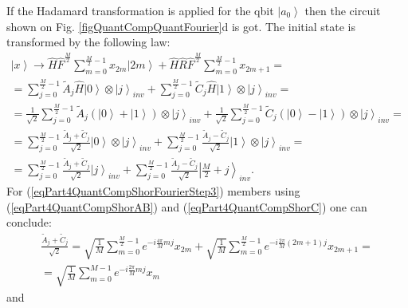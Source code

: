 \documentclass{llncs}
\begin{document}
If the Hadamard transformation is applied for the qbit 
$\left|a_0\right>$ then the circuit shown on 
Fig. \ref{figQuantCompQuantFourier}d is got. 
The initial state is transformed by the following law:
\begin{eqnarray}
\left|x\right> \rightarrow
\hat{H}\hat{F}^{\frac{M}{2}} \sum_{m = 0}^{\frac{M}{2} - 1}x_{2m} \left|2m\right> +
\hat{H}\hat{R}\hat{F}^{\frac{M}{2}}\sum_{m = 0}^{\frac{M}{2} - 1} x_{2m + 1} =
\nonumber \\
=
\sum_{j = 0}^{\frac{M}{2} - 1}
\tilde{A}_{j}
\hat{H}\left|0\right> \otimes \left|j\right>_{inv}
+
\sum_{j = 0}^{\frac{M}{2} - 1} 
\tilde{C}_{j}
\hat{H}\left|1\right> \otimes \left|j\right>_{inv} 
=
\nonumber \\
= 
\frac{1}{\sqrt{2}}\sum_{j = 0}^{\frac{M}{2} - 1}
\tilde{A}_{j} 
\left(\left|0\right> + \left|1\right> \right) \otimes  
\left|j\right>_{inv}
+
\frac{1}{\sqrt{2}}\sum_{j = 0}^{\frac{M}{2} - 1}
\tilde{C}_{j} 
\left(\left|0\right> - \left|1\right> \right) \otimes  
\left|j\right>_{inv}
=
\nonumber \\
=
\sum_{j = 0}^{\frac{M}{2} - 1}
\frac{\tilde{A}_{j} + \tilde{C}_{j} }{\sqrt{2}} 
\left|0\right> \otimes \left|j\right>_{inv} +
\sum_{j = 0}^{\frac{M}{2} - 1}
\frac{ \tilde{A}_{j} - \tilde{C}_{j}}{\sqrt{2}} 
\left|1\right> \otimes \left|j\right>_{inv}
=
\nonumber \\
=
\sum_{j = 0}^{\frac{M}{2} - 1}
\frac{\tilde{A}_{j} + \tilde{C}_{j} }{\sqrt{2}} \left|j\right>_{inv} +
\sum_{j = 0}^{\frac{M}{2} - 1}
\frac{ \tilde{A}_{j} - \tilde{C}_{j}}{\sqrt{2}} 
\left|\frac{M}{2} + j \right>_{inv}.
\label{eqPart4QuantCompShorFourierStep3}
\end{eqnarray}
For (\ref{eqPart4QuantCompShorFourierStep3}) members using 
(\ref{eqPart4QuantCompShorAB}) and (\ref{eqPart4QuantCompShorC}) one
can conclude:
\begin{eqnarray}
\frac{\tilde{A}_{j} + \tilde{C}_{j} }{\sqrt{2}} = 
\sqrt{\frac{1}{M}} 
\sum_{m = 0}^{\frac{M}{2} - 1} e^{-i \frac{4 \pi}{M} m j} x_{2m}  +
\sqrt{\frac{1}{M}} 
\sum_{m = 0}^{\frac{M}{2} - 1} 
e^{-i \frac{2 \pi}{M} \left(2m+1\right) j} x_{2m+1} = 
\nonumber \\
=
\sqrt{\frac{1}{M}} \sum_{m = 0}^{M - 1}
e^{-i \frac{2 \pi}{M} m j} x_{m}
\label{eqPart4QuantCompShorFourierStep3_1}
\end{eqnarray}
and
\end{document}
